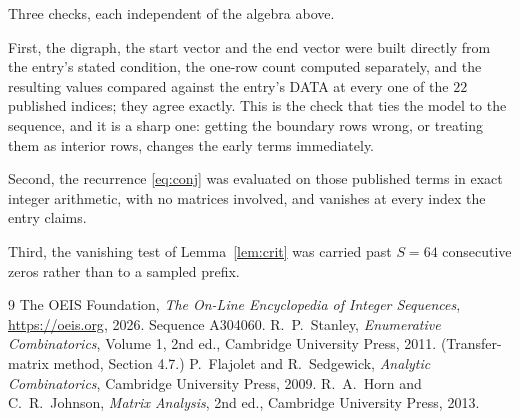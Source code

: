 \documentclass[11pt,a4paper]{article}
\theoremstyle{plain}
\theoremstyle{definition}
\begin{document}
Three checks, each independent of the algebra above.

First, the digraph, the start vector and the end vector were built directly from the
entry's stated condition, the one-row count computed separately, and the resulting values
compared against the entry's DATA at every one of the $22$ published indices; they
agree exactly. This is the check that ties the model to the sequence, and it is a sharp one:
getting the boundary rows wrong, or treating them as interior rows, changes the early terms
immediately.

Second, the recurrence \eqref{eq:conj} was evaluated on those published terms in exact
integer arithmetic, with no matrices involved, and vanishes at every index the entry claims.

Third, the vanishing test of Lemma~\ref{lem:crit} was carried past $S=64$ consecutive
zeros rather than to a sampled prefix.

\begin{thebibliography}{9}
 The OEIS Foundation, \emph{The On-Line Encyclopedia of Integer
Sequences}, \url{https://oeis.org}, 2026. Sequence A304060.
 R.~P.~Stanley, \emph{Enumerative Combinatorics}, Volume 1, 2nd ed.,
Cambridge University Press, 2011. (Transfer-matrix method, Section 4.7.)
 P.~Flajolet and R.~Sedgewick, \emph{Analytic Combinatorics}, Cambridge
University Press, 2009.
 R.~A.~Horn and C.~R.~Johnson, \emph{Matrix Analysis}, 2nd ed., Cambridge
University Press, 2013.
\end{thebibliography}
\end{document}
